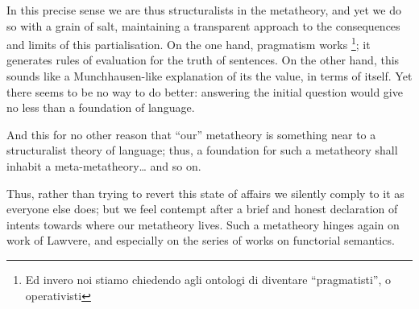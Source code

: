 In this precise sense we are thus structuralists in the metatheory, and yet we do so with a grain of salt, maintaining a transparent approach to the consequences and limits of this partialisation. On the one hand, pragmatism works \footnote{Ed invero noi stiamo chiedendo agli ontologi di diventare ``pragmatisti'', o operativisti}; it generates rules of evaluation for the truth of sentences. On the other hand, this sounds like a Munchhausen-like explanation of its the value, in terms of itself. Yet there seems to be no way to do better: answering the initial question would give no less than a foundation of language.

And this for no other reason that ``our'' metatheory is something near to a structuralist theory of language; thus, a foundation for such a metatheory shall inhabit a meta-metatheory\dots{} and so on.

Thus, rather than trying to revert this state of affairs we silently comply to it as everyone else does; but we feel contempt after a brief and honest declaration of intents towards where our metatheory lives. Such a metatheory hinges again on work of Lawvere, and especially on the series of works on functorial semantics.
